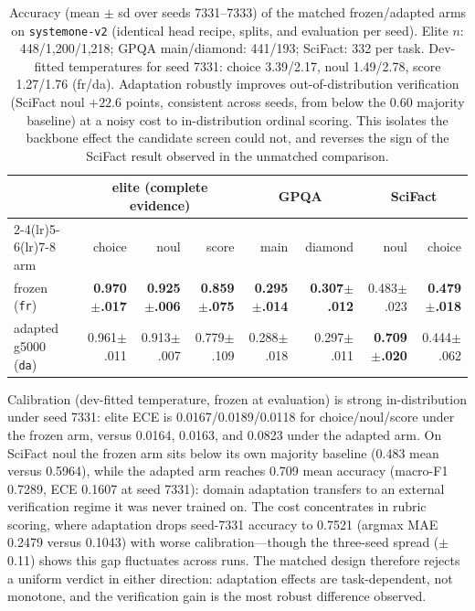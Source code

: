 \documentclass[11pt]{article}
\begin{document}
\begin{table}[htbp]
\centering\scriptsize
\setlength{\tabcolsep}{2.5pt}
\begin{tabular}{lrrrrrrr}
\toprule
 & \multicolumn{3}{c}{elite (complete evidence)} & \multicolumn{2}{c}{GPQA} &
   \multicolumn{2}{c}{SciFact} \\
\cmidrule(lr){2-4}\cmidrule(lr){5-6}\cmidrule(lr){7-8}
arm & choice & noul & score & main & diamond & noul & choice \\
\midrule
frozen (\texttt{fr})     & \textbf{0.970$\pm$.017} & \textbf{0.925$\pm$.006} & \textbf{0.859$\pm$.075} &
  \textbf{0.295$\pm$.014} & \textbf{0.307$\pm$.012} & 0.483$\pm$.023 & \textbf{0.479$\pm$.018} \\
adapted g5000 (\texttt{da}) & 0.961$\pm$.011 & 0.913$\pm$.007 & 0.779$\pm$.109 &
  0.288$\pm$.018 & 0.297$\pm$.011 & \textbf{0.709$\pm$.020} & 0.444$\pm$.062 \\
\bottomrule
\end{tabular}
\caption{Accuracy (mean $\pm$ sd over seeds 7331--7333) of the matched
frozen/adapted arms on \texttt{systemone-v2} (identical head recipe,
splits, and evaluation per seed). Elite $n$: 448/1{,}200/1{,}218; GPQA
main/diamond: 441/193; SciFact: 332 per task. Dev-fitted temperatures
for seed 7331: choice 3.39/2.17, noul 1.49/2.78, score 1.27/1.76
(fr/da). Adaptation robustly improves out-of-distribution verification
(SciFact noul $+22.6$ points, consistent across seeds, from below the
0.60 majority baseline) at a noisy cost to in-distribution ordinal
scoring. This isolates the backbone effect the candidate screen could
not, and reverses the sign of the SciFact result observed in the
unmatched comparison.}
\label{tab:matched}
\end{table}

Calibration (dev-fitted temperature, frozen at evaluation) is strong
in-distribution under seed 7331: elite ECE is 0.0167/0.0189/0.0118 for
choice/noul/score under the frozen arm, versus 0.0164, 0.0163, and
0.0823 under the adapted arm. On SciFact noul the frozen arm sits below its
own majority baseline (0.483 mean versus 0.5964), while the adapted arm
reaches 0.709 mean accuracy (macro-F1 0.7289, ECE 0.1607 at seed 7331):
domain adaptation transfers to an external verification regime it was
never trained on. The cost concentrates in rubric scoring, where
adaptation drops seed-7331 accuracy to 0.7521 (argmax MAE 0.2479 versus
0.1043) with worse calibration---though the three-seed spread
($\pm$0.11) shows this gap fluctuates across runs. The matched design
therefore rejects a uniform verdict in either direction: adaptation
effects are task-dependent, not monotone, and the verification gain is
the most robust difference observed.
\end{document}
